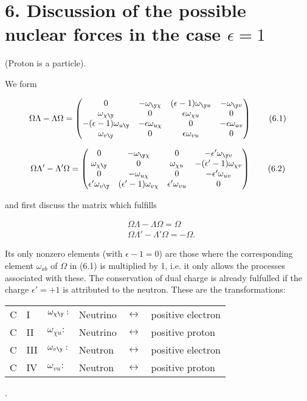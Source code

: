\documentclass{article}
\newcommand{\nequ}[2]{
\begin{align*}
#1
\tag{#2}
\end{align*}
}
\begin{document}
\section*{6. Discussion of the possible nuclear forces in the case $\epsilon=1$} (Proton is a particle).

We form
\nequ{
\Omega\Lambda - \Lambda\Omega = \left(\begin{matrix}
0 & -\omega_{\y\chi} & (\epsilon - 1)\omega_{\y u} & -\omega_{\y v}\\
\omega_{\chi\y} & 0 & \epsilon\omega_{\chi u} & 0\\
-(\epsilon - 1)\omega_{u\y} & -\epsilon\omega_{u\chi} & 0 & -\epsilon\omega_{uv}\\
\omega_{v\y} & 0 & \epsilon\omega_{vu} & 0
\end{matrix}\right)
}{6.1}
\nequ{
\Omega\Lambda' - \Lambda'\Omega = \left(\begin{matrix}
0 & -\omega_{\y\chi} & 0 & -\epsilon'\omega_{\y v}\\
\omega_{\chi\y} & 0 & \omega_{\chi u} & -(\epsilon'-1)\omega_{\chi v}\\
0 & -\omega_{u\chi} & 0 & -\epsilon'\omega_{uv}\\
\epsilon' \omega_{v\y} & (\epsilon' - 1)\omega_{v\chi} & \epsilon'\omega_{vu} & 0
\end{matrix}\right)
}{6.2}
and first discuss the matrix which fulfills
\nequ{
&\Omega\Lambda - \Lambda\Omega = \Omega\\
&\Omega\Lambda' - \Lambda'\Omega = -\Omega.
}{6.3}
Its only nonzero elements (with $\epsilon-1=0$) are those where the corresponding element $\omega_{ab}$ of $\Omega$ in (6.1) is multiplied by 1, i.e. it only allows the processes associated with these. The conservation of dual charge is already fulfulled if the charge $\epsilon'=+1$ is attributed to the neutron. These are the transformations:\\
\begin{tabular}{llllll}
C & I & $\omega_{\chi\y}:$ & Neutrino & $\leftrightarrow$ & positive electron\\
C & II & $\omega_{\chi u}:$ & Neutrino & $\leftrightarrow$ & positive proton \\
C & III & $\omega_{v\y}:$ & Neutron & $\leftrightarrow$ & positive electron\\
C & IV & $\omega_{v u}:$ & Neutron & $\leftrightarrow$ & positive proton\\
\end{tabular}.\\
\end{document}
